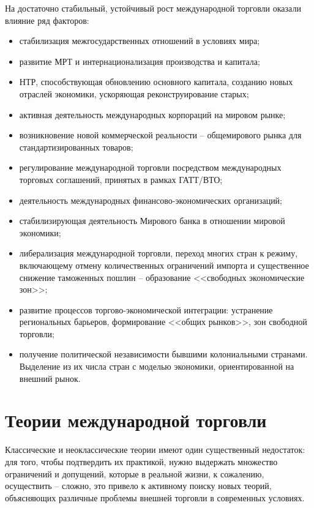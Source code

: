 На достаточно стабильный, устойчивый рост международной торговли оказали
влияние ряд факторов:
\begin{itemize}
    \item стабилизация межгосударственных отношений в условиях мира;
    \item развитие МРТ и интернационализация производства и капитала;
    \item НТР, способствующая обновлению основного капитала, созданию новых
  отраслей экономики, ускоряющая реконструирование старых;
    \item активная деятельность международных корпораций на мировом рынке;
    \item возникновение новой коммерческой реальности -- общемирового рынка для
  стандартизированных товаров;
    \item регулирование международной торговли посредством международных
  торговых соглашений, принятых в рамках ГАТТ/ВТО;
    \item деятельность международных финансово-экономических организаций;
    \item стабилизирующая деятельность Мирового банка в отношении мировой
  экономики;
    \item либерализация международной торговли, переход многих стран к режиму,
  включающему отмену количественных ограничений импорта и существенное
  снижение таможенных пошлин -- образование <<свободных экономические зон>>;
    \item развитие процессов торгово-экономической интеграции: устранение
  региональных барьеров, формирование <<общих рынков>>, зон свободной
  торговли;
    \item получение политической независимости бывшими колониальными странами.
  Выделение из их числа стран с моделью экономики, ориентированной на внешний
  рынок.
\end{itemize}

\pagebreak %

\chapter{Теории международной торговли}

Классические и неоклассические теории имеют один существенный недостаток: для
того, чтобы подтвердить их практикой, нужно выдержать множество ограничений и
допущений, которые в реальной жизни, к сожалению, осуществить -- сложно, это
привело к активному поиску новых теорий, объясняющих различные проблемы внешней
торговли в современных условиях.

